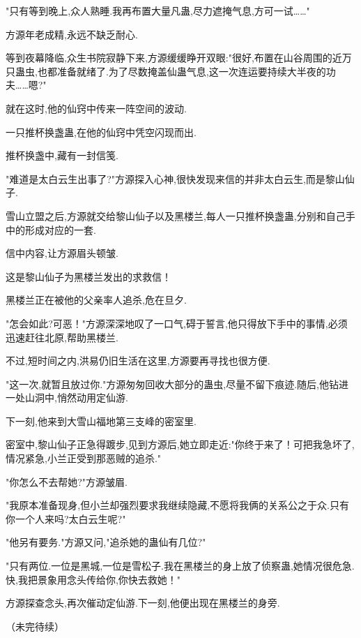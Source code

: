 \begin{this_body}
"只有等到晚上,众人熟睡.我再布置大量凡蛊,尽力遮掩气息,方可一试……"

方源年老成精,永远不缺乏耐心.

等到夜幕降临,众生书院寂静下来,方源缓缓睁开双眼:"很好,布置在山谷周围的近万只蛊虫,也都准备就绪了.为了尽数掩盖仙蛊气息,这一次连运要持续大半夜的功夫……嗯?"

就在这时,他的仙窍中传来一阵空间的波动.

一只推杯换盏蛊,在他的仙窍中凭空闪现而出.

推杯换盏中,藏有一封信笺.

"难道是太白云生出事了?"方源探入心神,很快发现来信的并非太白云生,而是黎山仙子.

雪山立盟之后,方源就交给黎山仙子以及黑楼兰,每人一只推杯换盏蛊,分别和自己手中的形成对应的一套.

信中内容,让方源眉头顿皱.

这是黎山仙子为黑楼兰发出的求救信！

黑楼兰正在被他的父亲率人追杀,危在旦夕.

"怎会如此?可恶！"方源深深地叹了一口气,碍于誓言,他只得放下手中的事情,必须迅速赶往北原,帮助黑楼兰.

不过,短时间之内,洪易仍旧生活在这里,方源要再寻找也很方便.

"这一次,就暂且放过你."方源匆匆回收大部分的蛊虫,尽量不留下痕迹.随后,他钻进一处山洞中,悄然动用定仙游.

下一刻,他来到大雪山福地第三支峰的密室里.

密室中,黎山仙子正急得踱步,见到方源后,她立即走近:"你终于来了！可把我急坏了,情况紧急,小兰正受到那恶贼的追杀."

"你怎么不去帮她?"方源皱眉.

"我原本准备现身,但小兰却强烈要求我继续隐藏,不愿将我俩的关系公之于众.只有你一个人来吗?太白云生呢?"

"他另有要务."方源又问,"追杀她的蛊仙有几位?"

"只有两位.一位是黑城,一位是雪松子.我在黑楼兰的身上放了侦察蛊,她情况很危急.快,我把景象用念头传给你,你快去救她！"

方源探查念头,再次催动定仙游.下一刻,他便出现在黑楼兰的身旁.

（未完待续）

\end{this_body}

